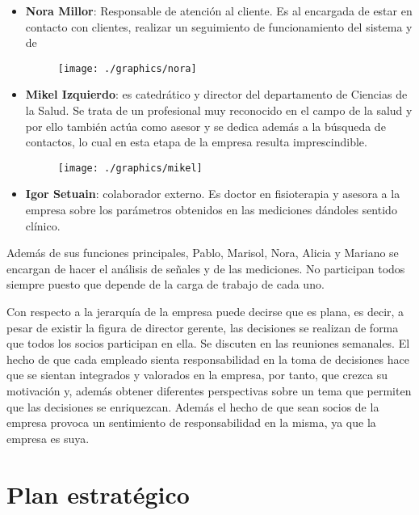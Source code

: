 \begin{itemize}
\begin{figure}[H]
			\end{figure}
			\item \textbf{Nora Millor}: Responsable de atención al cliente. Es al encargada de estar en contacto con clientes, realizar un seguimiento de funcionamiento del sistema y de 
			\begin{figure}[H]
				\centering
				\texttt{[image: ./graphics/nora]}
				
			\end{figure}
			\item \textbf{Mikel Izquierdo}: es catedrático y director del departamento de Ciencias de la Salud. Se trata de un profesional muy reconocido en el campo de la salud y por ello también actúa como asesor y se dedica además a la búsqueda de contactos, lo cual en esta etapa de la empresa resulta imprescindible.
			\begin{figure}[H]
				\centering
				\texttt{[image: ./graphics/mikel]}
				
			\end{figure}
			\item \textbf{Igor Setuain}: colaborador externo. Es doctor en fisioterapia y asesora a la empresa sobre los parámetros obtenidos en las mediciones dándoles sentido clínico.
			
		\end{itemize}
		
	Además de sus funciones principales, Pablo, Marisol, Nora, Alicia y Mariano se encargan de hacer el análisis de señales y de las mediciones. No participan todos siempre puesto que depende de la carga de trabajo de cada uno.
	
	Con respecto a la jerarquía de la empresa puede decirse que es plana, es decir, a pesar de existir la figura de director gerente, las decisiones se realizan de forma que todos los socios participan en ella. Se discuten en las reuniones semanales. El hecho de que cada empleado sienta responsabilidad en la toma de decisiones hace que se sientan integrados y valorados en la empresa, por tanto, que crezca su motivación y, además obtener diferentes perspectivas sobre un tema que permiten que las decisiones se enriquezcan. Además el hecho de que sean socios de la empresa provoca un sentimiento de responsabilidad en la misma, ya que la empresa es suya.
		


	\section{Plan estratégico}
	
